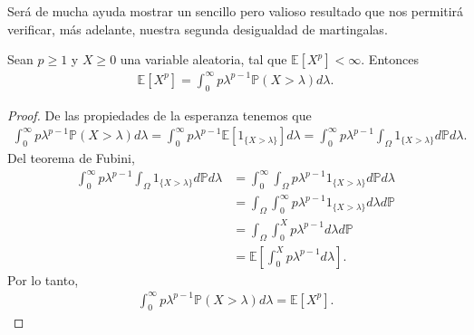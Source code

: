 Será de mucha ayuda mostrar un sencillo pero valioso resultado que nos permitirá verificar, más adelante, nuestra segunda desigualdad de martingalas.

\begin{lemma}
\label{repint}
Sean $p \geq 1$ y $X \geq 0$ una variable aleatoria, tal que $\mathbb{E}[X^p] < \infty$. Entonces
	\begin{align*}
		\mathbb{E}[X^p] = \int_0^{\infty} p \lambda^{p-1} \mathbb{P}(X > \lambda) d\lambda.
	\end{align*}
\end{lemma}
\begin{proof}
De las propiedades de la esperanza tenemos que
	\begin{align*}
		\int_0^{\infty} p \lambda^{p-1} \mathbb{P}(X > \lambda) d\lambda = \int_0^{\infty} p \lambda^{p-1} \mathbb{E}[1_{\{X > \lambda\}}] d\lambda = \int_0^{\infty} p \lambda^{p-1} \int_{\Omega} 1_{\{X > \lambda\}} d\mathbb{P} d\lambda.
	\end{align*}
Del teorema de Fubini,
	\begin{align*}
		\int_0^{\infty} p \lambda^{p-1} \int_{\Omega} 1_{\{X > \lambda\}} d\mathbb{P} d\lambda & = \int_0^{\infty} \int_{\Omega} p \lambda^{p-1} 1_{\{X > \lambda\}} d\mathbb{P} d\lambda \\
		& = \int_{\Omega} \int_0^{\infty} p \lambda^{p-1} 1_{\{X > \lambda\}} d\lambda d\mathbb{P} \\
		& = \int_{\Omega} \int_0^{X} p \lambda^{p-1} d\lambda d\mathbb{P} \\
		& = \mathbb{E}\left[ \int_0^{X} p \lambda^{p-1} d\lambda \right].
	\end{align*}
	Por lo tanto, 
	\begin{align*}
		\int_0^{\infty} p \lambda^{p-1} \mathbb{P}(X > \lambda) d\lambda = \mathbb{E}[X^p].
	\end{align*}
\end{proof}

